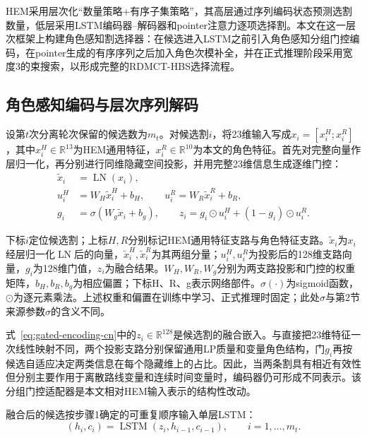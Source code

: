 \documentclass[final,5p,times,twocolumn]{elsarticle}
\begin{document}
HEM采用层次化“数量策略+有序子集策略”，其高层通过序列编码状态预测选割数量，低层采用LSTM编码器--解码器和pointer注意力逐项选择割\citep{wang2023hem,vinyals2015pointer}。本文在这一层次框架上构建角色感知割选择器：在候选进入LSTM之前引入角色感知分组门控编码，在pointer生成的有序序列之后加入角色次模补全，并在正式推理阶段采用宽度3的束搜索，以形成完整的RDMCT-HBS选择流程。


\subsection{角色感知编码与层次序列解码}

设第$t$次分离轮次保留的候选数为$m_t$。对候选割$i$，将23维输入写成$x_i=[x_i^{H};x_i^{R}]$，其中$x_i^{H}\in\mathbb R^{13}$为HEM通用特征，$x_i^{R}\in\mathbb R^{10}$为本文的角色特征。首先对完整向量作层归一化，再分别进行同维隐藏空间投影，并用完整23维信息生成逐维门控：
\begin{equation}
\begin{aligned}
\widetilde x_i&=\operatorname{LN}(x_i),\\
u_i^{H}&=W_H\widetilde x_i^{H}+b_H,\qquad
u_i^{R}=W_R\widetilde x_i^{R}+b_R,\\
g_i&=\sigma(W_g\widetilde x_i+b_g),\qquad
z_i=g_i\odot u_i^{H}+(1-g_i)\odot u_i^{R}.
\end{aligned}
\label{eq:gated-encoding-cn}
\end{equation}

下标$i$定位候选割；上标$H,R$分别标记HEM通用特征支路与角色特征支路。$\widetilde x_i$为$x_i$经层归一化$\operatorname{LN}$后的向量，$\widetilde x_i^{H},\widetilde x_i^{R}$为其两组分量；$u_i^{H},u_i^{R}$为投影后的128维支路向量，$g_i$为128维门值，$z_i$为融合结果。$W_H,W_R,W_g$分别为两支路投影和门控的权重矩阵，$b_H,b_R,b_g$为相应偏置；下标H、R、g表示网络部件。$\sigma(\cdot)$为sigmoid函数，$\odot$为逐元素乘法。上述权重和偏置在训练中学习、正式推理时固定；此处$\sigma$与第2节来源参数$\sigma$的含义不同。


式~\eqref{eq:gated-encoding-cn}中的$z_i\in\mathbb R^{128}$是候选割的融合嵌入。与直接把23维特征一次线性映射不同，两个投影支路分别保留通用LP质量和变量角色结构，门$g_i$再按候选自适应决定两类信息在每个隐藏维上的占比。因此，当两条割具有相近有效性但分别主要作用于离散路线变量和连续时间变量时，编码器仍可形成不同表示。该分组门控适配器是本文相对HEM输入表示的结构性改动。

融合后的候选按步骤1确定的可重复顺序输入单层LSTM：
\begin{equation}
(h_i,c_i)=\operatorname{LSTM}(z_i,h_{i-1},c_{i-1}),\qquad i=1,\ldots,m_t .
\label{eq:lstm-encoding-cn}
\end{equation}
\end{document}
